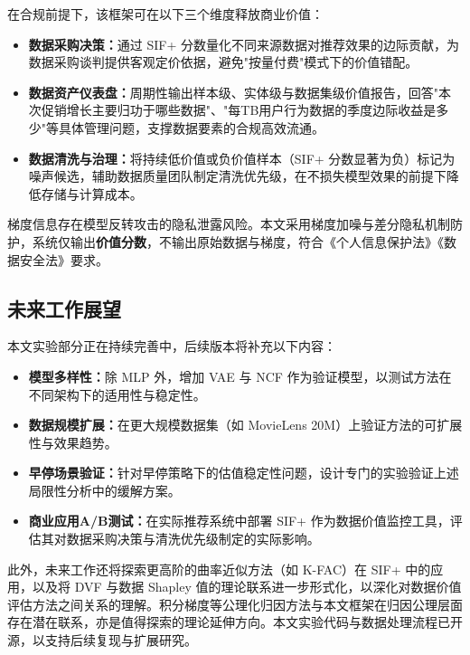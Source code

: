 \documentclass[12pt,a4paper]{ctexart}
\theoremstyle{definition}
\theoremstyle{plain}
\begin{document}
在合规前提下，该框架可在以下三个维度释放商业价值：

\begin{itemize}
    \item \textbf{数据采购决策：}通过 SIF+ 分数量化不同来源数据对推荐效果的边际贡献，为数据采购谈判提供客观定价依据，避免"按量付费"模式下的价值错配。
    \item \textbf{数据资产仪表盘：}周期性输出样本级、实体级与数据集级价值报告，回答"本次促销增长主要归功于哪些数据"、"每TB用户行为数据的季度边际收益是多少"等具体管理问题，支撑数据要素的合规高效流通。
    \item \textbf{数据清洗与治理：}将持续低价值或负价值样本（SIF+ 分数显著为负）标记为噪声候选，辅助数据质量团队制定清洗优先级，在不损失模型效果的前提下降低存储与计算成本。
\end{itemize}

梯度信息存在模型反转攻击的隐私泄露风险。本文采用梯度加噪与差分隐私机制防护，系统仅输出\textbf{价值分数}，不输出原始数据与梯度，符合《个人信息保护法》《数据安全法》要求。

\subsection{未来工作展望}
本文实验部分正在持续完善中，后续版本将补充以下内容：
\begin{itemize}
    \item \textbf{模型多样性：}除 MLP 外，增加 VAE 与 NCF 作为验证模型，以测试方法在不同架构下的适用性与稳定性。
    \item \textbf{数据规模扩展：}在更大规模数据集（如 MovieLens 20M）上验证方法的可扩展性与效果趋势。
    \item \textbf{早停场景验证：}针对早停策略下的估值稳定性问题，设计专门的实验验证上述局限性分析中的缓解方案。
    \item \textbf{商业应用A/B测试：}在实际推荐系统中部署 SIF+ 作为数据价值监控工具，评估其对数据采购决策与清洗优先级制定的实际影响。
\end{itemize}
此外，未来工作还将探索更高阶的曲率近似方法（如 K-FAC）在 SIF+ 中的应用，以及将 DVF 与数据 Shapley 值的理论联系进一步形式化，以深化对数据价值评估方法之间关系的理解。积分梯度等公理化归因方法\cite{sundararajan2017axiomatic}与本文框架在归因公理层面存在潜在联系，亦是值得探索的理论延伸方向。本文实验代码与数据处理流程已开源\cite{repository}，以支持后续复现与扩展研究。
\end{document}
